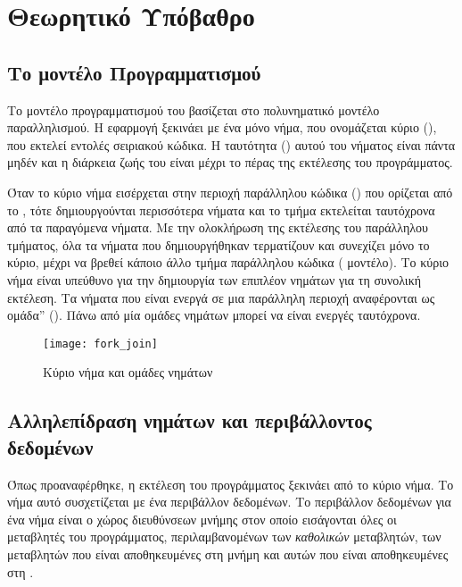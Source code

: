 \clearpage
\section{Θεωρητικό Υπόβαθρο}
\subsection{Το μοντέλο Προγραμματισμού }
Το μοντέλο προγραμματισμού του \emph{} βασίζεται στο πολυνηματικό μοντέλο παραλληλισμού.
Η εφαρμογή ξεκινάει με ένα μόνο νήμα, που ονομάζεται κύριο (\emph{}), που εκτελεί
εντολές σειριακού κώδικα. H ταυτότητα (\emph{}) αυτού του νήματος είναι πάντα μηδέν και η
διάρκεια ζωής του είναι μέχρι το πέρας της εκτέλεσης του προγράμματος\cite{pdplab}. 

Όταν το κύριο νήμα εισέρχεται στην περιοχή παράλληλου κώδικα () που ορίζεται από το , τότε
δημιουργούνται περισσότερα νήματα και το τμήμα εκτελείται ταυτόχρονα από τα παραγόμενα νήματα.
Με την ολοκλήρωση της εκτέλεσης του παράλληλου τμήματος, όλα τα νήματα που δημιουργήθηκαν
τερματίζουν και συνεχίζει μόνο το κύριο, μέχρι να βρεθεί κάποιο άλλο τμήμα παράλληλου κώδικα
( μοντέλο)\cite{pdplab}. Το κύριο νήμα είναι υπεύθυνο για την δημιουργία των επιπλέον
νημάτων για τη συνολική εκτέλεση. Τα νήματα που είναι ενεργά σε μια παράλληλη περιοχή αναφέρονται ως
ομάδα” (\emph{}). Πάνω από μία ομάδες νημάτων μπορεί να είναι ενεργές
ταυτόχρονα\cite{ompblaise}.

\begin{figure}[h]
\texttt{[image: fork\_join]}
\captionsetup{justification=centering, singlelinecheck=false}
\caption{Κύριο νήμα και ομάδες νημάτων}
\label{fig:fork_join}
\end{figure}

\subsection{Αλληλεπίδραση νημάτων και περιβάλλοντος δεδομένων}
Όπως προαναφέρθηκε, η εκτέλεση του προγράμματος ξεκινάει από το κύριο νήμα. Το νήμα αυτό
συσχετίζεται με ένα περιβάλλον δεδομένων. Το περιβάλλον δεδομένων για ένα νήμα είναι ο χώρος
διευθύνσεων μνήμης στον οποίο εισάγονται όλες οι μεταβλητές του προγράμματος, περιλαμβανομένων των
\emph{καθολικών} μεταβλητών, των μεταβλητών που είναι αποθηκευμένες στη μνήμη \emph{} και
αυτών που είναι αποθηκευμένες στη \emph{}\cite{book2}. 

